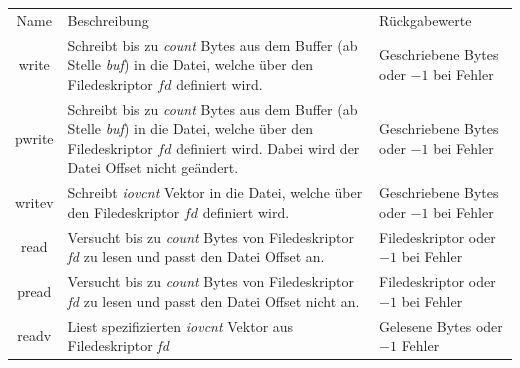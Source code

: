                     \begin{table}[ht]
                        \small
                        \centering
                        \begin{tabular}{cp{6cm}p{3cm}}
                            \hline
                            \rowcolor{GruvGray!36}
                            \multicolumn{3}{c}{System Calls}\\
                            \hline
                            Name & Beschreibung & Rückgabewerte\\
                            \hline
                            \hline
                            \rowcolor{GruvGray!16}
                            write   & Schreibt bis zu \textit{count} Bytes aus dem Buffer (ab Stelle \textit{buf}) in die Datei, welche über den Filedeskriptor $fd$ definiert wird. & Geschriebene Bytes oder $-1$ bei Fehler\\
                            pwrite  & Schreibt bis zu \textit{count} Bytes aus dem Buffer (ab Stelle \textit{buf}) in die Datei, welche über den Filedeskriptor $fd$ definiert wird. Dabei wird der Datei Offset nicht geändert.& Geschriebene Bytes oder $-1$ bei Fehler\\
                            \rowcolor{GruvGray!16}
                            writev  & Schreibt \textit{iovcnt} Vektor in die Datei, welche über den Filedeskriptor $fd$ definiert wird.& Geschriebene Bytes oder $-1$ bei Fehler\\

                            read    & Versucht bis zu \textit{count} Bytes von Filedeskriptor \textit{fd} zu lesen und passt den Datei Offset an.                                              & Filedeskriptor oder $-1$ bei Fehler\\
                            \rowcolor{GruvGray!16}
                            pread   & Versucht bis zu \textit{count} Bytes von Filedeskriptor \textit{fd} zu lesen und passt den Datei Offset nicht an.                                        & Filedeskriptor oder $-1$ bei Fehler\\
                            readv   & Liest spezifizierten \textit{iovcnt} Vektor aus Filedeskriptor \textit{fd} & Gelesene Bytes oder $-1$ Fehler\\


\end{tabular}
\end{table}
